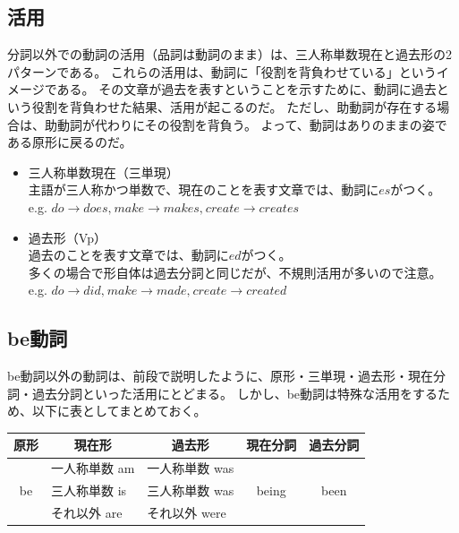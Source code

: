 \documentclass[11pt,a4paper,titlepage]{jsarticle}
\begin{document}
\subsection{活用}

分詞以外での動詞の活用（品詞は動詞のまま）は、三人称単数現在と過去形の2パターンである。
これらの活用は、動詞に「役割を背負わせている」というイメージである。
その文章が過去を表すということを示すために、動詞に過去という役割を背負わせた結果、活用が起こるのだ。
ただし、助動詞が存在する場合は、助動詞が代わりにその役割を背負う。
よって、動詞はありのままの姿である原形に戻るのだ。

\begin{itemize}
  \item 三人称単数現在（三単現）\\
  主語が三人称かつ単数で、現在のことを表す文章では、動詞に$es$がつく。\\
  e.g. $do \rightarrow does \text{,}~ make \rightarrow makes \text{,}~ create \rightarrow creates$
  \item 過去形（Vp）\\
  過去のことを表す文章では、動詞に$ed$がつく。\\
  多くの場合で形自体は過去分詞と同じだが、不規則活用が多いので注意。\\
  e.g. $do \rightarrow did \text{,}~ make \rightarrow made \text{,}~ create \rightarrow created$
\end{itemize}

\subsection{be動詞}

be動詞以外の動詞は、前段で説明したように、原形・三単現・過去形・現在分詞・過去分詞といった活用にとどまる。
しかし、be動詞は特殊な活用をするため、以下に表としてまとめておく。

\begin{table}[h]
  \centering
  \begin{tabular}{cllcc}
    \hline
    原形 & \multicolumn{1}{c}{現在形} & \multicolumn{1}{c}{過去形} & 現在分詞 & 過去分詞\\
    \hline \hline
     & 一人称単数 am & 一人称単数 was & & \\
    be & 三人称単数 is & 三人称単数 was & being & been \\
     & それ以外 are & それ以外 were & & \\
     \hline
  \end{tabular}
\end{table}
\end{document}
